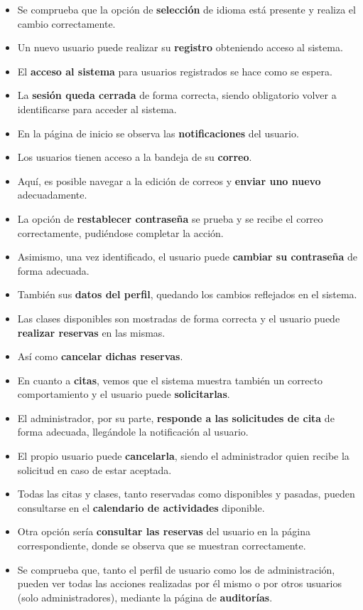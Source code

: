 \begin{itemize}
\item Se comprueba que la opción de \textbf{selección} de idioma está presente y realiza el cambio correctamente.
\item Un nuevo usuario puede realizar su \textbf{registro} obteniendo acceso al sistema.
\item El \textbf{acceso al sistema} para usuarios registrados se hace como se espera.
\item La \textbf{sesión queda cerrada} de forma correcta, siendo obligatorio volver a identificarse para acceder al sistema.
\item En la página de inicio se observa las \textbf{notificaciones} del usuario.
\item Los usuarios tienen acceso a la bandeja de su \textbf{correo}.
\item Aquí, es posible navegar a la edición de correos y \textbf{enviar uno nuevo} adecuadamente.
\item La opción de \textbf{restablecer contraseña} se prueba y se recibe el correo correctamente, pudiéndose completar la acción.
\item Asimismo, una vez identificado, el usuario puede \textbf{cambiar su contraseña} de forma adecuada.
\item También sus \textbf{datos del perfil}, quedando los cambios reflejados en el sistema.
\item Las clases disponibles son mostradas de forma correcta y el usuario puede \textbf{realizar reservas} en las mismas.
\item Así como \textbf{cancelar dichas reservas}.
\item En cuanto a \textbf{citas}, vemos que el sistema muestra también un correcto comportamiento y el usuario puede \textbf{solicitarlas}.
\item El administrador, por su parte, \textbf{responde a las solicitudes de cita} de forma adecuada, llegándole la notificación al usuario.
\item El propio usuario puede \textbf{cancelarla}, siendo el administrador quien recibe la solicitud en caso de estar aceptada.
\item Todas las citas y clases, tanto reservadas como disponibles y pasadas, pueden consultarse en el \textbf{calendario de actividades} diponible.
\item Otra opción sería \textbf{consultar las reservas} del usuario en la página correspondiente, donde se observa que se muestran correctamente.
\item Se comprueba que, tanto el perfil de usuario como los de administración, pueden ver todas las acciones realizadas por él mismo o por otros usuarios (solo administradores), mediante la página de \textbf{auditorías}.

\end{itemize}
